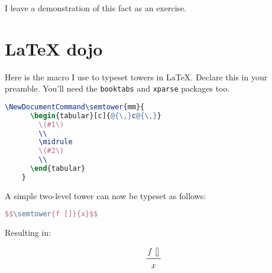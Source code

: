\documentclass[nols,twoside,nofonts,nobib,nohyper]{tufte-handout}
\begin{document}
\begin{appendices}
    I leave a demonstration of this fact as an exercise.





  \section{{\LaTeX} dojo}

  Here is the macro I use to typeset towers in \LaTeX. Declare this in your
  preamble. You'll need the \texttt{booktabs} and \texttt{xparse} packages too.

  \begin{lstlisting}[language=TeX]
    \NewDocumentCommand\semtower{mm}{
      \begin{tabular}[c]{@{\,}c@{\,}}
        \(#1\)
        \\
        \midrule
        \(#2\)
        \\
      \end{tabular}
    }
  \end{lstlisting}

 A simple two-level tower can now be typeset as follows:

    \begin{lstlisting}[language=TeX]
      $$\semtower{f []}{x}$$
  \end{lstlisting}

  Resulting in:

  $$\semtower{f []}{x}$$

  \end{appendices}
\end{document}
